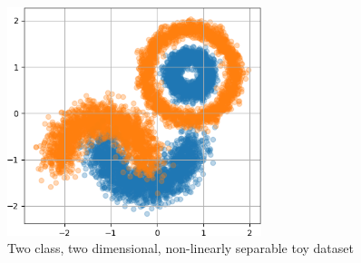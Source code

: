 \documentclass[12pt,oneside]{CUNY_PhD}
\begin{document}
\begin{figure}[!htbp]
    \centering
        \includegraphics[width=0.66\textwidth]{images/2D-network-toy/2d-toy-data.png}
    \caption{Two class, two dimensional, non-linearly separable toy dataset}
    \label{fig:toy-2d-data}
\end{figure}
\end{document}
